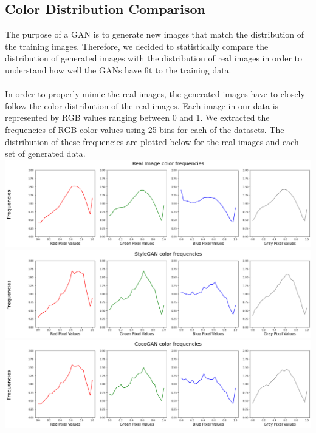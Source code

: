 \documentclass[10pt]{article}
\begin{document}
\begin{multicols*}{2}
        \subsection{Color Distribution Comparison}
        \label{subsec:colorDistribution}
        The purpose of a GAN is to generate new images that match the distribution of the training images. Therefore, we decided to statistically compare the distribution of generated images with the distribution of real images in order to understand how well the GANs have fit to the training data.
        \\\\
        In order to properly mimic the real images, the generated images have to closely follow the color distribution of the real images. Each image in our data is represented by RGB values ranging between 0 and 1. We extracted the frequencies of RGB color values using 25 bins for each of the datasets. The distribution of these frequencies are plotted below for the real images and each set of generated data.
        \\
        \includegraphics[scale =0.21]{color-distributions/real_color_freq.png}
        \includegraphics[scale =0.21]{color-distributions/stylegan_color_freq.png}
        \includegraphics[scale =0.21]{color-distributions/cocogan_color_freq.png}
        \\

\end{multicols*}
\end{document}
